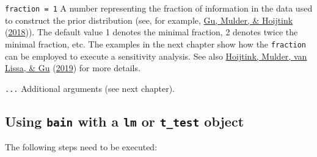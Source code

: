 \documentclass[
]{book}
\begin{document}
\texttt{fraction\ =\ 1} A number representing the fraction of information in the data used to construct the prior distribution (see, for example, \protect\hyperlink{ref-gu2018approximated}{Gu, Mulder, \& Hoijtink} (\protect\hyperlink{ref-gu2018approximated}{2018})). The default value 1 denotes the minimal fraction, 2 denotes twice the minimal fraction, etc. The examples in the next chapter show how the \texttt{fraction} can be employed to execute a sensitivity analysis. See also \protect\hyperlink{ref-e575e990fdef4c469a1c19a210d58e2f}{Hoijtink, Mulder, van Lissa, \& Gu} (\protect\hyperlink{ref-e575e990fdef4c469a1c19a210d58e2f}{2019}) for more details.

\texttt{...} Additional arguments (see next chapter).

\hypertarget{using-bain-with-a-lm-or-t_test-object}{%
\subsection{\texorpdfstring{Using \texttt{bain} with a \texttt{lm} or \texttt{t\_test} object}{Using bain with a lm or t\_test object}}\label{using-bain-with-a-lm-or-t_test-object}}

The following steps need to be executed:
\end{document}
